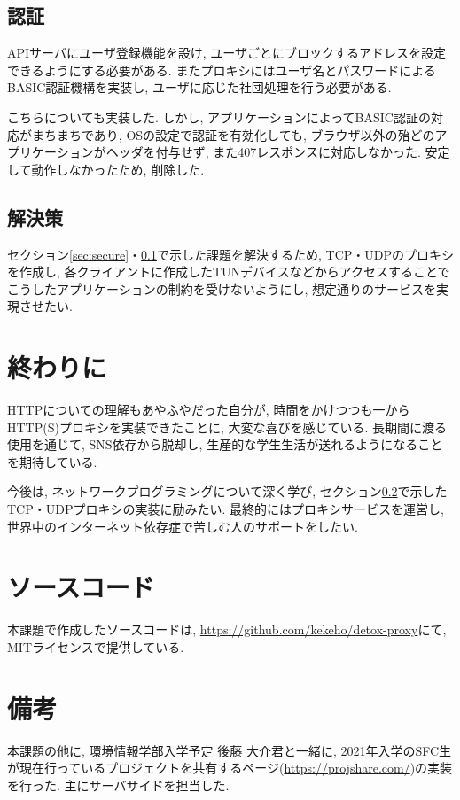 \documentclass[10pt,a4paper,uplatex,a4j,dvipdfmx]{jsarticle}
\begin{document}
\begin{multicols}{2}
    \subsection{認証}
    \label{sec:auth}
    APIサーバにユーザ登録機能を設け, ユーザごとにブロックするアドレスを設定できるようにする必要がある.
    またプロキシにはユーザ名とパスワードによるBASIC認証機構を実装し, ユーザに応じた社団処理を行う必要がある.
    
    こちらについても実装した. しかし, アプリケーションによってBASIC認証の対応がまちまちであり, OSの設定で認証を有効化しても, ブラウザ以外の殆どのアプリケーションがヘッダを付与せず, また407レスポンスに対応しなかった. 安定して動作しなかったため, 削除した.
    
    \subsection{解決策}
    \label{sec:resolv}
    セクション\ref{sec:secure}・\ref{sec:auth}で示した課題を解決するため, TCP・UDPのプロキシを作成し, 各クライアントに作成したTUNデバイスなどからアクセスすることでこうしたアプリケーションの制約を受けないようにし, 想定通りのサービスを実現させたい.
    
    
    \section{終わりに}
    HTTPについての理解もあやふやだった自分が, 時間をかけつつも一からHTTP(S)プロキシを実装できたことに, 大変な喜びを感じている.
    長期間に渡る使用を通じて, SNS依存から脱却し, 生産的な学生生活が送れるようになることを期待している.
    
    今後は, ネットワークプログラミングについて深く学び, セクション\ref{sec:resolv}で示したTCP・UDPプロキシの実装に励みたい. 最終的にはプロキシサービスを運営し, 世界中のインターネット依存症で苦しむ人のサポートをしたい.
    \end{multicols}


  \printbibliography[title=参考文献]
  
  \section*{ソースコード}
  本課題で作成したソースコードは, \url{https://github.com/kekeho/detox-proxy}にて, MITライセンス\cite{detox:license}で提供している.
  
  \section*{備考}
  本課題の他に, 環境情報学部入学予定 後藤 大介君と一緒に, 2021年入学のSFC生が現在行っているプロジェクトを共有するページ(\url{https://projshare.com/})の実装を行った. 主にサーバサイドを担当した.
\end{document}
